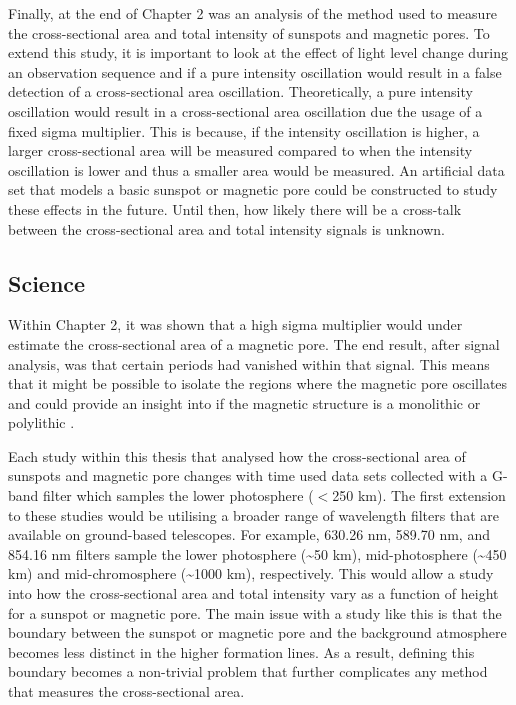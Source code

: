     Finally, at the end of Chapter 2 was an analysis of the method used to measure the cross-sectional area and total intensity of sunspots and magnetic pores.
    To extend this study, it is important to look at the effect of light level change during an observation sequence and if a pure intensity oscillation would result in a false detection of a cross-sectional area oscillation. 
    Theoretically, a pure intensity oscillation would result in a cross-sectional area oscillation due the usage of a fixed sigma multiplier.
    This is because, if the intensity oscillation is higher, a larger cross-sectional area will be measured compared to when the intensity oscillation is lower and thus a smaller area would be measured.
    An artificial data set that models a basic sunspot or magnetic pore could be constructed to study these effects in the future.  
    Until then, how likely there will be a cross-talk between the cross-sectional area and total intensity signals is unknown.
                
    \subsection{Science}
 
	Within Chapter 2, it was shown that a high sigma multiplier would under estimate the cross-sectional area of a magnetic pore.
	The end result, after signal analysis, was that certain periods had vanished within that signal.
	This means that it might be possible to isolate the regions where the magnetic pore oscillates and could provide an insight into if the magnetic structure is a monolithic or polylithic \citep{1979ApJ...230..905P}.
 
    Each study within this thesis that analysed how the cross-sectional area of sunspots and magnetic pore changes with time used data sets collected with a G-band filter which samples the lower photosphere ($<$250 km).
    The first extension to these studies would be utilising a broader range of wavelength filters that are available on ground-based telescopes.    
    For example,  630.26 nm,  589.70 nm, and  854.16 nm filters sample the lower photosphere (\textasciitilde50 km), mid-photosphere (\textasciitilde 450 km) and mid-chromosphere (\textasciitilde1000 km), respectively.
    This would allow a study into how the cross-sectional area and total intensity vary as a function of height for a sunspot or magnetic pore. 
    The main issue with a study like this is that the boundary between the sunspot or magnetic pore and the background atmosphere becomes less distinct in the higher formation lines.
    As a result, defining this boundary becomes a non-trivial problem that further complicates any method that measures the cross-sectional area.

